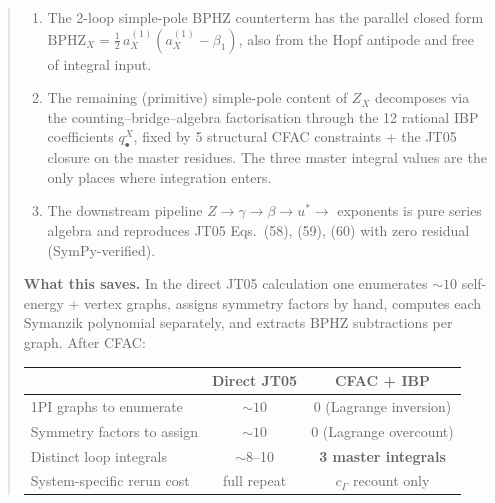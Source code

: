 \documentclass[11pt,a4paper]{article}
\theoremstyle{definition}
\theoremstyle{plain}
\begin{document}
\begin{abstract}
\begin{enumerate}[leftmargin=2em,label=(\textsf{C\arabic*})]
    Hopf-antipode evaluation)
    \begin{equation*}
      \boxed{\;
        Z_X^{(2,2)} \;=\; \tfrac{1}{2}\,a_X^{(1)}\bigl(\beta_1 + a_X^{(1)}\bigr),
        \qquad \beta_1 = a_u^{(1)} - 2\,a_\psi^{(1)} = \tfrac{3}{2}
        \;}
    \end{equation*}
    produces all \emph{four} 2-loop double poles
    $\{Z_\psi, Z_\lambda, Z_\tau, Z_u\}^{(2,2)} =
     \{\tfrac{7}{32}, \tfrac{13}{128}, \tfrac{1}{2}, \tfrac{7}{2}\}$,
    matching JT05 Eq.~(57) exactly.
  \item The 2-loop simple-pole BPHZ counterterm has the parallel
    closed form $\mathrm{BPHZ}_X = \tfrac{1}{2}\,a_X^{(1)}(a_X^{(1)} -
    \beta_1)$, also from the Hopf antipode and free of integral input.
  \item The remaining (primitive) simple-pole content of $Z_X$
    decomposes via the counting--bridge--algebra factorisation through
    the 12 rational IBP coefficients $q^X_\bullet$, fixed by 5
    structural CFAC constraints + the JT05 closure on the master
    residues.  The three master integral values are the only places
    where integration enters.
  \item The downstream pipeline $Z \to \gamma \to \beta \to u^* \to$
    exponents is pure series algebra and reproduces JT05 Eqs.~(58),
    (59), (60) with zero residual (SymPy-verified).
\end{enumerate}

\textbf{What this saves.}  In the direct JT05 calculation one
enumerates $\sim 10$ self-energy + vertex graphs, assigns symmetry
factors by hand, computes each Symanzik polynomial separately, and
extracts BPHZ subtractions per graph.  After CFAC:

\begin{center}
\begin{tabular}{@{}lcc@{}}
\toprule
& \textbf{Direct JT05} & \textbf{CFAC + IBP} \\
\midrule
1PI graphs to enumerate & $\sim 10$ & 0 (Lagrange inversion) \\
Symmetry factors to assign & $\sim 10$ & 0 (Lagrange overcount) \\
Distinct loop integrals & $\sim 8$--10 & \textbf{3 master integrals} \\
System-specific rerun cost & full repeat & $c_\Gamma$ recount only \\
\bottomrule
\end{tabular}
\end{center}


\end{abstract}
\end{document}
